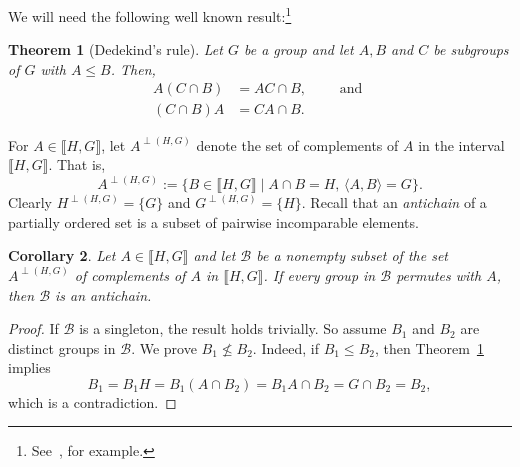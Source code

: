 \documentclass{gen-j-l}
\newcommand{\lb}{\ensuremath{\llbracket}}
\newcommand{\rb}{\ensuremath{\rrbracket}}
\newcommand{\<}{\ensuremath{\langle}}
\newcommand{\cB}{\ensuremath{\mathcal{B}}}
\renewcommand{\>}{\ensuremath{\rangle}}
\theoremstyle{plain}
\newtheorem{theorem}{Theorem}[section]
\newtheorem{corollary}[theorem]{Corollary}
\theoremstyle{definition}
\theoremstyle{remark}
\numberwithin{theorem}{section}
\numberwithin{claim}{section}
\numberwithin{equation}{section}
\numberwithin{conjecture}{section}
\renewcommand{\leq}{\ensuremath{\leqslant}}
\renewcommand{\nleq}{\ensuremath{\nleqslant}}
\newcommand{\subnormal}{\ensuremath{\trianglelefteqslant}}
\newcommand{\2}{\ensuremath{\mathbf{2}}}
\newcommand{\3}{\ensuremath{\mathbf{3}}}
\begin{document}
We will need the following well known result:\footnote{See~\cite[p.~122]{Rose:1978}, for example.}  
\begin{theorem}[Dedekind's rule]
  \label{lemma-dedekind}
Let $G$ be a group and let $A, B$ and $C$ be subgroups of $G$ with $A\leq B$.  Then,
\begin{align}
\label{eq:dedekind1}
A(C\cap B) &= AC \cap B,\qquad \text{ and }\\
\label{eq:dedekind2}
(C\cap B)A &= CA \cap B.
\end{align}
\end{theorem}

For $A \in \lb H, G \rb$, let $A^{\perp(H,G)}$ denote the set of
complements of $A$ in the interval $\lb H, G\rb$.  That is,
\[
A^{\perp(H,G)} := \{B \in \lb H, G \rb \mid A \cap B = H, \, \<A, B\> = G\}.
\]
Clearly $H^{\perp(H,G)} = \{G\}$ and $G^{\perp(H,G)} = \{H\}$.
Recall that an \emph{antichain} of a partially ordered set is a subset of
pairwise incomparable elements.

\begin{corollary}
\label{cor:dedekind1}
Let $A \in \lb H, G\rb$ and let 
$\cB$ be a nonempty subset of the set $A^{\perp(H,G)}$ of complements of $A$ in
$\lb H, G \rb$.  If every group in $\cB$ permutes with $A$, then $\cB$ is an
antichain. 
\end{corollary}
\begin{proof}
If $\cB$ is a singleton, the result holds
trivially. So assume $B_1$ and $B_2$ are distinct groups in $\cB$. 
We prove $B_1 \nleq B_2$.  Indeed, if $B_1 \leq B_2$, then 
Theorem~\ref{lemma-dedekind} implies
\[
B_1 = B_1H = B_1(A \cap B_2) = B_1A \cap B_2 = G \cap B_2 = B_2,
\]
which is a contradiction.
\end{proof}

\end{document}
